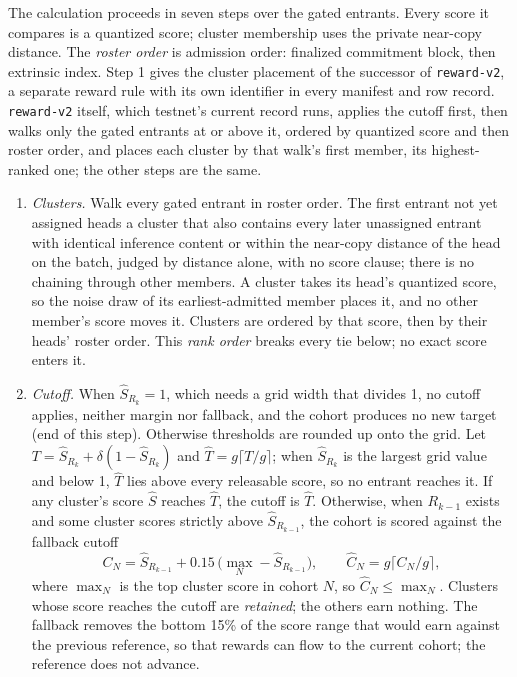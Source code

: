 The calculation proceeds in seven steps over the gated entrants. Every score it
compares is a quantized score; cluster membership uses the private near-copy
distance. The \emph{roster order} is admission order: finalized commitment
block, then extrinsic index. Step 1 gives the cluster placement of the
successor of \texttt{reward-v2}, a separate reward rule with its own
identifier in every manifest and row record. \texttt{reward-v2} itself, which
testnet's current record runs, applies the cutoff first, then walks only the
gated entrants at or above it, ordered by quantized score and then roster
order, and places each cluster by that walk's first member, its highest-ranked
one; the other steps are the same.
\begin{enumerate}\tightlist
\item \emph{Clusters.} Walk every gated entrant in roster order. The first
entrant not yet assigned heads a cluster that also contains every later
unassigned entrant with identical inference content or within the near-copy
distance of the head on the batch, judged by distance alone, with no score
clause; there is no chaining through other members. A cluster takes its head's
quantized score, so the noise draw of its earliest-admitted member places it,
and no other member's score moves it. Clusters are ordered by that score, then
by their heads' roster order. This \emph{rank order} breaks every tie below;
no exact score enters it.
\item \emph{Cutoff.} When \(\hat S_{R_k}=1\), which needs a grid width that
divides 1, no cutoff applies, neither margin
nor fallback, and the cohort produces no new target (end of this step).
Otherwise thresholds are rounded up onto the grid. Let
\(T=\hat S_{R_k}+\delta(1-\hat S_{R_k})\) and \(\hat T=g\lceil T/g\rceil\);
when \(\hat S_{R_k}\) is the largest grid value and below 1, \(\hat T\) lies
above every releasable score, so no entrant reaches it. If
any cluster's score \(\hat S\) reaches \(\hat T\), the cutoff is \(\hat T\).
Otherwise, when \(R_{k-1}\) exists and some cluster scores strictly above
\(\hat S_{R_{k-1}}\), the cohort is scored against the fallback cutoff
\[
 C_N=\hat S_{R_{k-1}}+0.15\,\bigl(\max_N-\hat S_{R_{k-1}}\bigr),\qquad
 \hat C_N=g\lceil C_N/g\rceil,
\]
where \(\max_N\) is the top cluster score in cohort \(N\), so
\(\hat C_N\leq\max_N\). Clusters whose score reaches the cutoff are
\emph{retained}; the others earn nothing. The fallback removes the
bottom 15\% of the score range that would earn against the previous reference,
so that rewards can flow to the current cohort; the reference does not advance.

\end{enumerate}
